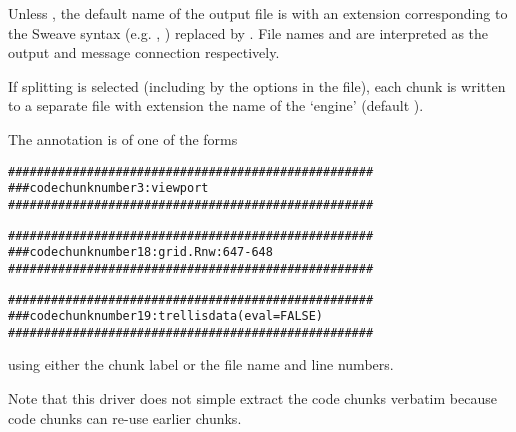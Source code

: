 %
\begin{Details}\relax
Unless , the default name of the output file is
 with an extension corresponding to the Sweave
syntax (e.g. , ) replaced by .  File
names  and  are interpreted as the
output and message connection respectively.

If splitting is selected (including by the options in the file), each
chunk is written to a separate file with extension the name of the
`engine' (default ).

The annotation is of one of the forms
\begin{alltt}###################################################
### code chunk number 3: viewport
###################################################

###################################################
### code chunk number 18: grid.Rnw:647-648
###################################################

###################################################
### code chunk number 19: trellisdata (eval = FALSE)
###################################################
\end{alltt}

using either the chunk label or the file name and line numbers.

Note that this driver does not simple extract the code chunks verbatim
because code chunks can re-use earlier chunks.
\end{Details}
%
